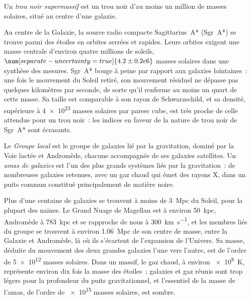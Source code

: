 \begin{definition}\label{def:b3:milky-way-galaxies:smbh}
Un \emph{trou noir supermassif} est un trou noir
d'au moins un million de masses solaires, situé au centre d'une galaxie.
\end{definition}

Au centre de la Galaxie, la source radio compacte Sagittarius~A*
(Sgr~A*) se trouve parmi des étoiles en orbites serrées et rapides. Leurs orbites exigent une
masse centrale d'environ quatre millions de soleils, $\num[separate-uncertainty=true]{4.2 \pm 0.2 e6}$
masses solaires dans une synthèse des mesures. Sgr~A* bouge à peine
par rapport aux galaxies lointaines~: une fois le mouvement du Soleil retiré, son
mouvement résiduel ne dépasse pas quelques kilomètres par seconde, de sorte qu'il renferme
au moins un quart de cette masse. Sa taille est comparable à son rayon de Schwarzschild,
et sa densité, supérieure à \num{4e23} masses solaires par
parsec cube, est très proche de celle attendue pour un trou noir~: les indices
en faveur de la nature de trou noir de Sgr~A* sont écrasants.

\begin{definition}\label{def:b3:milky-way-galaxies:groups}
Le \emph{Groupe local} est le groupe de galaxies lié par la gravitation,
dominé par la Voie lactée et Andromède, chacune accompagnée de ses galaxies satellites.
Un \emph{amas de galaxies} est l'un des plus grands
systèmes liés par la gravitation~: de nombreuses galaxies retenues, avec un gaz chaud
qui émet des rayons X, dans un puits commun constitué principalement de matière
noire.
\end{definition}

Plus d'une centaine de galaxies se trouvent à moins de \qty{3}{Mpc} du Soleil, pour la plupart
des naines. Le Grand Nuage de Magellan est à environ \qty{50}{kpc}, Andromède à
\qty{783}{kpc} et se rapproche de nous à \qty{300}{km.s^{-1}}, et les membres
liés du groupe se trouvent à environ \qty{1.06}{Mpc} de son centre de
masse, entre la Galaxie et Andromède, là où ils s'écartent de
l'expansion de l'Univers. Sa masse, déduite du mouvement des deux grandes
galaxies l'une vers l'autre, est de l'ordre de \num{5e12} masses solaires. Dans un
 massif, le gaz chaud, à environ \qty{e8}{K}, représente environ dix
fois la masse des étoiles~; galaxies et gaz réunis sont trop légers pour
la profondeur du puits gravitationnel, et l'essentiel de la masse de l'amas,
de l'ordre de \num{e15} masses solaires, est sombre.

